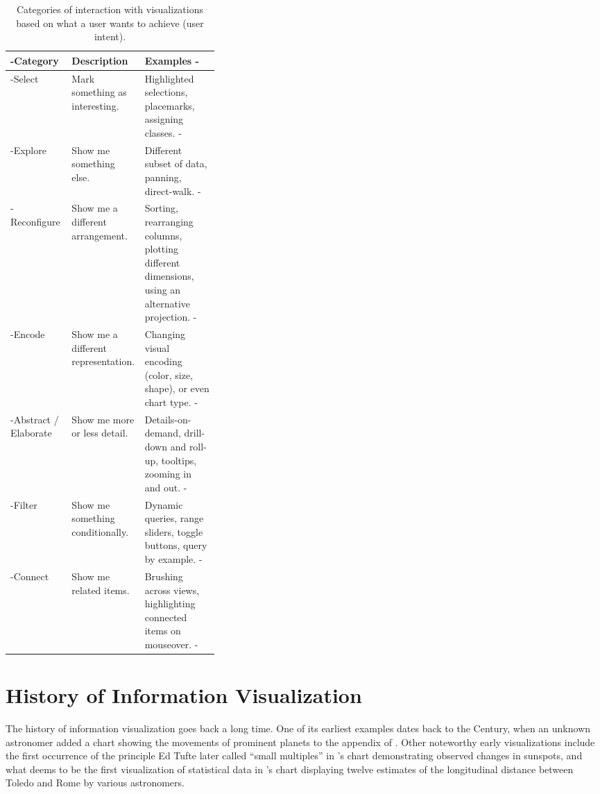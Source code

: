 \begin{table}[tp]
\tablestretch
{}
\centering
\begin{small}
\begin{tabularx}{\linewidth}{>{\kern-\tabcolsep}lL{0.35\linewidth}X<{\kern-\tabcolsep}}
\toprule
Category & Description & Examples \\
\midrule
Select &
  Mark something as interesting. &
  Highlighted selections, placemarks, assigning classes. \\
Explore &
  Show me something else. &
  Different subset of data, panning, direct-walk. \\
Reconfigure &
  Show me a different arrangement. &
  Sorting, rearranging columns, plotting different dimensions, using an alternative projection. \\
Encode &
  Show me a different representation. &
  Changing visual encoding (color, size, shape), or even chart type. \\
Abstract / Elaborate &
  Show me more or less detail. &
  Details-on-demand, drill-down and roll-up, tooltips, zooming in and out. \\
Filter &
  Show me something conditionally. &
  Dynamic queries, range sliders, toggle buttons, query by example. \\
Connect &
  Show me related items. &
  Brushing across views, highlighting connected items on mouseover. \\
\bottomrule
\end{tabularx}
\end{small}
\caption[Categories of Interaction Based on User Intent]{
Categories of interaction with visualizations based on what
a user wants to achieve (user intent).
}
\label{tab:UserIntentCategories}
\end{table}






\section{History of Information Visualization}

The history of information visualization goes back a long time. One of
its earliest examples dates back to the  Century, when an
unknown astronomer added a chart showing the movements of prominent
planets to the appendix of \textcite{CommentariiInSomniumScipionis}.
Other noteworthy early visualizations include the first occurrence of
the principle Ed Tufte later called \enquote{small multiples}
\parencite{VisualDisplayOfQuantitativeInformation} in
\textcite{RosaUrsina}'s chart demonstrating observed changes in
sunspots, and what \textcite[15]{VisualExplanations} deems to be the
first visualization of statistical data in \textcite{RomeToledoBook}'s
chart displaying twelve estimates of the longitudinal distance between
Toledo and Rome by various astronomers.



